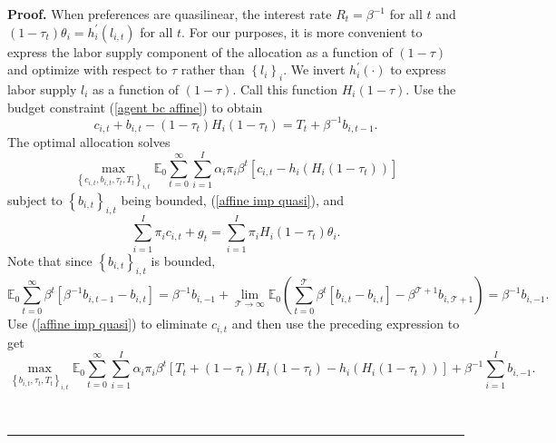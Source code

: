 \documentclass[thmsb,11pt]{article}
\newenvironment{proof}[1][Proof]{\noindent \textbf{#1.} }{\  \rule{0.5em}{0.5em}}
\begin{document}
\begin{proof}
When preferences are quasilinear, the interest rate $R_{t}=\beta
^{-1}$ for all $t$ and %
$\left( 1-\tau _{t}\right) \theta _{i}=h_{i}^{\prime }(l_{i,t})$ for all $%
t.$ For our purposes, it is more convenient to express the labor supply
component of the allocation as a function of $\left( 1-\tau \right) $ and
optimize with respect to $\tau $ rather than $\left\{ l_{i}\right\} _{i}.$
We  invert  $h_{i}^{\prime }(\cdot )$ to express labor supply $%
l_{i}$ as a function of $\left( 1-\tau \right) .$ Call this function $%
H_{i}\left( 1-\tau \right) $. Use the budget
constraint (\ref{agent bc affine}) to obtain
\begin{equation}
c_{i,t}+b_{i,t}-\left( 1-\tau _{t}\right) H_{i}\left( 1-\tau _{t}\right)
=T_{t}+\beta ^{-1}b_{i,t-1}.  \label{affine imp quasi}
\end{equation}%
The optimal allocation solves
\begin{equation}
\max_{\left\{ c_{i,t},b_{i,t},\tau_t,T_{t}\right\} _{i,t}}\mathbb{E}%
_{0}\sum_{t=0}^{\infty }\sum_{i=1}^{I}\alpha _{i}\pi _{i}\beta ^{t}\left[
c_{i,t}-h_{i}\left( H_{i}\left( 1-\tau_t \right) \right) \right]
\label{AMSS max}
\end{equation}%
subject to $\left\{ b_{i,t}\right\} _{i,t}$ being bounded, (\ref{affine imp
quasi}), and
\begin{equation*}
\sum_{i=1}^{I}\pi _{i}c_{i,t}+g_{t}=\sum_{i=1}^{I}\pi _{i} H_{i}\left( 1-\tau _{t}\right)\theta_i .
\end{equation*}%
Note that since $\left\{ b_{i,t}\right\} _{i,t}$ is bounded,
\begin{equation*}
\mathbb{E}_{0}\sum_{t=0}^{\infty }\beta ^{t}\left[ \beta
^{-1}b_{i,t-1}-b_{i,t}\right] =\beta ^{-1}b_{i,-1}+\lim_{\mathcal{T}%
\rightarrow \infty }\mathbb{E}_{0}\left( \sum_{t=0}^{\mathcal{T}}\beta ^{t}%
\left[ b_{i,t}-b_{i,t}\right] -\beta ^{\mathcal{T}+1}b_{i,\mathcal{T}%
+1}\right) =\beta ^{-1}b_{i,-1}.
\end{equation*}%
Use (\ref{affine imp quasi}) to eliminate $c_{i,t}$ and then use  the preceding
expression  to get
\begin{equation}
\max_{\left\{ b_{i,t},\tau _{t},T_{t}\right\} _{i,t}}\mathbb{E}%
_{0}\sum_{t=0}^{\infty }\sum_{i=1}^{I}\alpha _{i}\pi _{i}\beta ^{t}\left[
T_{t}+\left( 1-\tau _{t}\right) H_{i}\left( 1-\tau _{t}\right) -h_{i}\left(
H_{i}\left( 1-\tau_t \right) \right) \right] +\beta
^{-1}\sum_{i=1}^{I}b_{i,-1}.  \label{quasilinear max}
\end{equation}%

\end{proof}
\end{document}
